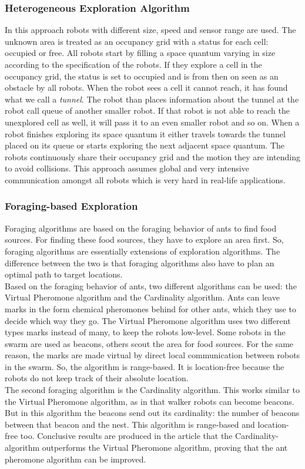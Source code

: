 	\subsubsection{Heterogeneous Exploration Algorithm}
	In this approach robots with different size, speed and sensor range are used.
	The unknown area is treated as an occupancy grid with a status for each cell: occupied or free.
	All robots start by filling a space quantum varying in size according to the specification of the robots.
	If they explore a cell in the occupancy grid, the status is set to occupied and is from then on seen as an obstacle by all robots.
	When the robot sees a cell it cannot reach, it has found what we call a \emph{tunnel}.
	The robot than places information about the tunnel at the robot call queue of another smaller robot.
	If that robot is not able to reach the unexplored cell as well, it will pass it to an even smaller robot and so on.
	When a robot finishes exploring its space quantum it either travels towards the tunnel placed on its queue or starts exploring the next adjacent space quantum.
	The robots continuously share their occupancy grid and the motion they are intending to avoid collisions.
	This approach assumes global and very intensive communication amongst all robots which is very hard in real-life applications. \cite{singh1993map}

	\subsubsection{Foraging-based Exploration}
	Foraging algorithms are based on the foraging behavior of ants to find food sources. \cite{hoff2010two}
	For finding these food sources, they have to explore an area first. 
	So, foraging algorithms are essentially extensions of exploration algorithms. 
	The difference between the two is that foraging algorithms also have to plan an optimal path to target locations. \\	
	Based on the foraging behavior of ants, two different algorithms can be used: the Virtual Pheromone algorithm and the Cardinality algorithm.
	Ants can leave marks in the form chemical pheromones behind for other ants, which they use to decide which way they go. 
	The Virtual Pheromone algorithm uses two different types marks instead of many, to keep the robots low-level. 
	Some robots in the swarm are used as beacons, others scout the area for food sources. 
	For the same reason, the marks are made virtual by direct local communication between robots in the swarm.
	So, the algorithm is range-based. 
	It is location-free because the robots do not keep track of their absolute location.\\
	The second foraging algorithm is the Cardinality algorithm. 
	This works similar to the Virtual Pheromone algorithm, as in that walker robots can become beacons. 
	But in this algorithm the beacons send out its cardinality: the number of beacons between that beacon and the nest. 
	This algorithm is range-based and location-free too.
	Conclusive results are produced in the article that the Cardinality-algorithm outperforms the Virtual Pheromone algorithm, proving that the ant pheromone algorithm can be improved.\\

